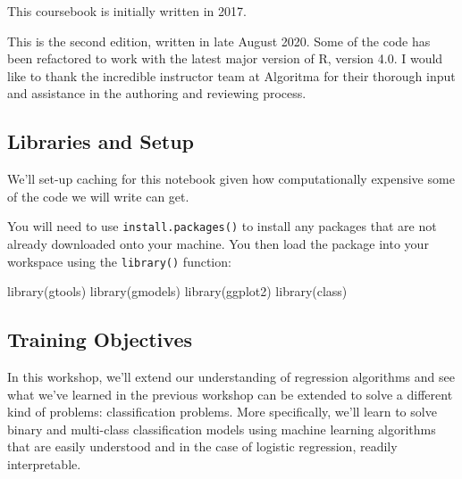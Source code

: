 \documentclass[
]{article}
\newenvironment{Shaded}{\begin{snugshade}}{\end{snugshade}}
\newcommand{\AttributeTok}[1]{\textcolor[rgb]{0.77,0.63,0.00}{#1}}
\newcommand{\ConstantTok}[1]{\textcolor[rgb]{0.00,0.00,0.00}{#1}}
\newcommand{\DecValTok}[1]{\textcolor[rgb]{0.00,0.00,0.81}{#1}}
\newcommand{\FunctionTok}[1]{\textcolor[rgb]{0.00,0.00,0.00}{#1}}
\newcommand{\NormalTok}[1]{#1}
\newcommand{\SpecialCharTok}[1]{\textcolor[rgb]{0.00,0.00,0.00}{#1}}
\begin{document}
This coursebook is initially written in 2017.

This is the second edition, written in late August 2020. Some of the
code has been refactored to work with the latest major version of R,
version 4.0. I would like to thank the incredible instructor team at
Algoritma for their thorough input and assistance in the authoring and
reviewing process.

\hypertarget{libraries-and-setup}{%
\subsection{Libraries and Setup}\label{libraries-and-setup}}

We'll set-up caching for this notebook given how computationally
expensive some of the code we will write can get.

\begin{Shaded}
\end{Shaded}

You will need to use \texttt{install.packages()} to install any packages
that are not already downloaded onto your machine. You then load the
package into your workspace using the \texttt{library()} function:

\begin{Shaded}
\begin{Highlighting}[]
\FunctionTok{library}\NormalTok{(gtools)}
\FunctionTok{library}\NormalTok{(gmodels)}
\FunctionTok{library}\NormalTok{(ggplot2)}
\FunctionTok{library}\NormalTok{(class)}
\end{Highlighting}
\end{Shaded}

\hypertarget{training-objectives}{%
\subsection{Training Objectives}\label{training-objectives}}

In this workshop, we'll extend our understanding of regression
algorithms and see what we've learned in the previous workshop can be
extended to solve a different kind of problems: classification problems.
More specifically, we'll learn to solve binary and multi-class
classification models using machine learning algorithms that are easily
understood and in the case of logistic regression, readily
interpretable.
\end{document}
